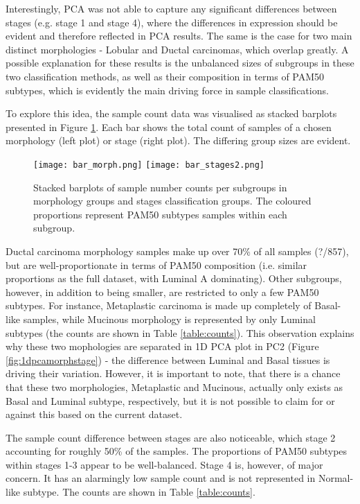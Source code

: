     
    \newpage
    Interestingly, PCA was not able to capture any significant differences between stages (e.g. stage 1 and stage 4), where the differences in expression should be evident and therefore reflected in PCA results. The same is the case for two main distinct morphologies - Lobular and Ductal carcinomas, which overlap greatly. A possible explanation for these results is the unbalanced sizes of subgroups in these two classification methods, as well as their composition in terms of PAM50 subtypes, which is evidently the main driving force in sample classifications. 
    
    To explore this idea, the sample count data was visualised as stacked barplots presented in Figure \ref{fig:barms}. Each bar shows the total count of samples of a chosen morphology (left plot) or stage (right plot). The differing group sizes are evident.         
    
       
        \begin{figure}[!h]
        \texttt{[image: bar\_morph.png]}\hfill
        \texttt{[image: bar\_stages2.png]}
        \caption{Stacked barplots of sample number counts per subgroups in morphology groups and stages classification groups. The coloured proportions represent PAM50 subtypes samples within each subgroup.}
        \label{fig:barms}
        \end{figure}
        
    Ductal carcinoma morphology samples make up over 70\% of all samples (?/857), but are well-proportionate in terms of PAM50 composition (i.e. similar proportions as the full dataset, with Luminal A dominating). Other subgroups, however, in addition to being smaller, are restricted to only a few PAM50 subtypes. For instance, Metaplastic carcinoma is made up completely of Basal-like samples, while Mucinous morphology is represented by only Luminal subtypes (the counts are shown in Table \ref{table:counts}). This observation explains why these two mophologies are separated in 1D PCA plot in PC2 (Figure \ref{fig:1dpcamorphstage}) - the difference between Luminal and Basal tissues is driving their variation. However, it is important to note, that there is a chance that these two morphologies, Metaplastic and Mucinous, actually only exists as Basal and Luminal subtype, respectively, but it is not possible to claim for or against this based on the current dataset.    
    
    The sample count difference between stages are also noticeable, which stage 2 accounting for roughly 50\% of the samples. The proportions of PAM50 subtypes within stages 1-3 appear to be well-balanced. Stage 4 is, however, of major concern. It has an alarmingly low sample count and is not represented in Normal-like subtype. The counts are shown in Table \ref{table:counts}.
        
